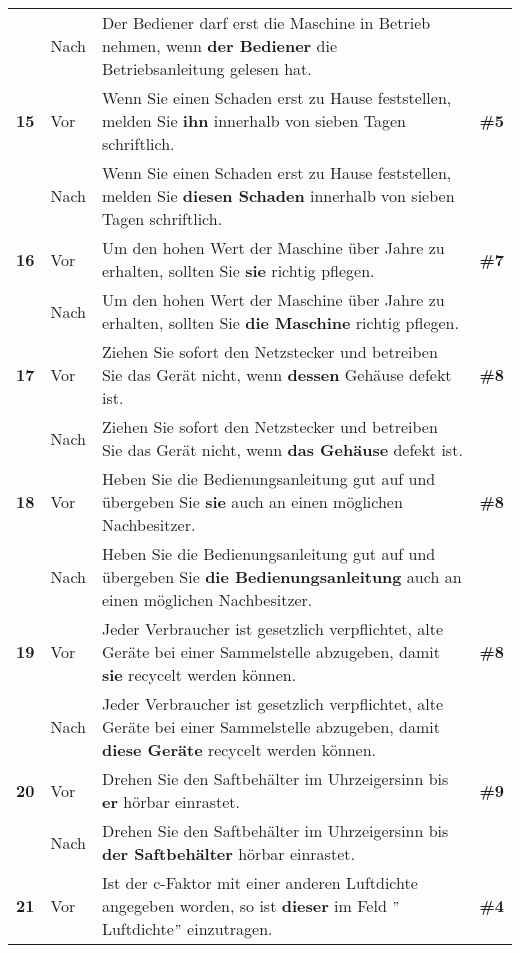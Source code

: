 \begin{longtable}{llp{}l}
& Nach & Der Bediener darf erst die Maschine in Betrieb nehmen, wenn \textbf{der Bediener} die Betriebsanleitung gelesen hat. & \\
\tablevspace
{ \textbf{15}} & Vor & Wenn Sie einen Schaden erst zu Hause feststellen, melden Sie \textbf{ihn} innerhalb von sieben Tagen schriftlich. & \textbf{\#5}\\
& Nach & Wenn Sie einen Schaden erst zu Hause feststellen, melden Sie \textbf{diesen Schaden} innerhalb von sieben Tagen schriftlich. & \\
\tablevspace
{ \textbf{16}} & Vor & Um den hohen Wert der Maschine über Jahre zu erhalten, sollten Sie \textbf{sie} richtig pflegen. & \textbf{\#7}\\
& Nach & Um den hohen Wert der Maschine über Jahre zu erhalten, sollten Sie \textbf{die Maschine} richtig pflegen. & \\
\tablevspace
{ \textbf{17}} & Vor & Ziehen Sie sofort den Netzstecker und betreiben Sie das Gerät nicht, wenn \textbf{dessen} Gehäuse defekt ist. & \textbf{\#8}\\
& Nach & Ziehen Sie sofort den Netzstecker und betreiben Sie das Gerät nicht, wenn \textbf{das Gehäuse} defekt ist. & \\
\tablevspace
{ \textbf{18}} & Vor & Heben Sie die Bedienungsanleitung gut auf und übergeben Sie \textbf{sie} auch an einen möglichen Nachbesitzer. & \textbf{\#8}\\
& Nach & Heben Sie die Bedienungsanleitung gut auf und übergeben Sie \textbf{die Bedienungsanleitung} auch an einen möglichen Nachbesitzer. & \\
\tablevspace
{ \textbf{19}} & Vor & Jeder Verbraucher ist gesetzlich verpflichtet, alte Geräte bei einer Sammelstelle abzugeben, damit \textbf{sie} recycelt werden können. & \textbf{\#8}\\
& Nach & Jeder Verbraucher ist gesetzlich verpflichtet, alte Geräte bei einer Sammelstelle abzugeben, damit \textbf{diese Geräte} recycelt werden können. & \\
\tablevspace
{ \textbf{20}} & Vor & Drehen Sie den Saftbehälter im Uhrzeigersinn bis \textbf{er} hörbar einrastet. & \textbf{\#9}\\
& Nach & Drehen Sie den Saftbehälter im Uhrzeigersinn bis \textbf{der Saftbehälter} hörbar einrastet. & \\
\tablevspace
{ \textbf{21}} & Vor & Ist der c-Faktor mit einer anderen Luftdichte angegeben worden, so ist \textbf{dieser} im Feld $"$Luftdichte$"$ einzutragen. & \textbf{\#4}\\

\end{longtable}
